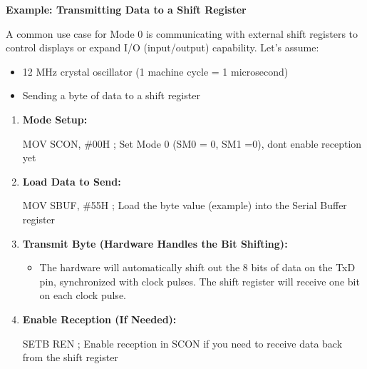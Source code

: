 \documentclass[
]{article}
\newenvironment{Shaded}{}{}
\newcommand{\NormalTok}[1]{#1}
\begin{document}
\textbf{Example: Transmitting Data to a Shift Register}

A common use case for Mode 0 is communicating with external shift
registers to control displays or expand I/O (input/output) capability.
Let's assume:

\begin{itemize}
\item
  12 MHz crystal oscillator (1 machine cycle = 1 microsecond)
\item
  Sending a byte of data to a shift register
\end{itemize}

\begin{enumerate}
\def\labelenumi{\arabic{enumi}.}
\item
  \textbf{Mode Setup:}

\begin{Shaded}
\begin{Highlighting}[]
\NormalTok{MOV SCON, \#00H ; Set Mode 0 (SM0 = 0, SM1 =0), don\textquotesingle{}t enable reception yet}
\end{Highlighting}
\end{Shaded}
\item
  \textbf{Load Data to Send:}

\begin{Shaded}
\begin{Highlighting}[]
\NormalTok{MOV SBUF, \#55H ; Load the byte value (example) into the Serial Buffer register}
\end{Highlighting}
\end{Shaded}
\item
  \textbf{Transmit Byte (Hardware Handles the Bit Shifting):}

  \begin{itemize}
  \item
    The hardware will automatically shift out the 8 bits of data on the
    TxD pin, synchronized with clock pulses. The shift register will
    receive one bit on each clock pulse.
  \end{itemize}
\item
  \textbf{Enable Reception (If Needed):}

\begin{Shaded}
\begin{Highlighting}[]
\NormalTok{SETB REN ; Enable reception in SCON if you need to receive data back from the shift register}
\end{Highlighting}
\end{Shaded}
\end{enumerate}
\end{document}
